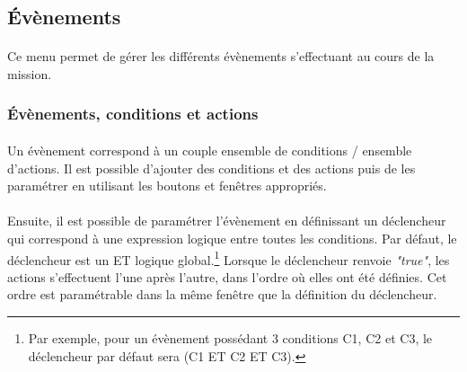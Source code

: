 \documentclass[a4paper]{article}
\begin{document}
\subsection{Évènements}
\paragraph{ }
Ce menu permet de gérer les différents évènements s'effectuant au cours de la mission.
\subsubsection{Évènements, conditions et actions}
\paragraph{ }
Un évènement correspond à un couple ensemble de conditions / ensemble d'actions. Il est possible d'ajouter des conditions et des actions puis de les paramétrer en utilisant les boutons et fenêtres appropriés.
\paragraph{ }
Ensuite, il est possible de paramétrer l'évènement en définissant un déclencheur qui correspond à une expression logique entre toutes les conditions. Par défaut, le déclencheur est un ET logique global.\footnote{Par exemple, pour un évènement possédant 3 conditions C1, C2 et C3, le déclencheur par défaut sera (C1 ET C2 ET C3).} Lorsque le déclencheur renvoie \textit{"true"}, les actions s'effectuent l'une après l'autre, dans l'ordre où elles ont été définies. Cet ordre est paramétrable dans la même fenêtre que la définition du déclencheur.
\end{document}
